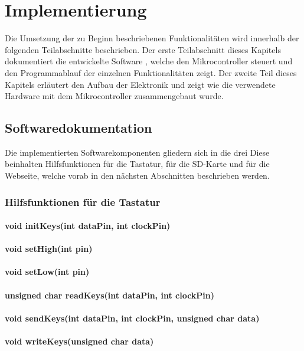 \chapter{Implementierung}
Die Umsetzung der zu Beginn beschriebenen Funktionalitäten wird innerhalb der folgenden Teilabschnitte beschrieben. Der erste Teilabschnitt dieses Kapitels dokumentiert die entwickelte Software \cite{badps2}, welche den Mikrocontroller steuert und den Programmablauf der einzelnen Funktionalitäten zeigt. Der zweite Teil dieses Kapitels erläutert den Aufbau der Elektronik und zeigt wie die verwendete Hardware mit dem Mikrocontroller zusammengebaut wurde.



\section{Softwaredokumentation}
Die implementierten Softwarekomponenten \cite{badps2} gliedern sich in die drei  Diese beinhalten Hilfsfunktionen für die Tastatur, für die SD-Karte und für die Webseite, welche vorab in den nächsten Abschnitten beschrieben werden.

\subsection{Hilfsfunktionen für die Tastatur}
\subsubsection{void initKeys(int dataPin, int clockPin)}
\subsubsection{void setHigh(int pin)}
\subsubsection{void setLow(int pin)}
\subsubsection{unsigned char readKeys(int dataPin, int clockPin)}
\subsubsection{void sendKeys(int dataPin, int clockPin, unsigned char data)}
\subsubsection{void writeKeys(unsigned char data)}


